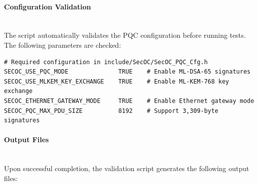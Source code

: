\paragraph{Configuration Validation}
\mbox{}\\
The script automatically validates the PQC configuration before running tests.
The following parameters are checked:

\begin{verbatim}
# Required configuration in include/SecOC/SecOC_PQC_Cfg.h
SECOC_USE_PQC_MODE              TRUE    # Enable ML-DSA-65 signatures
SECOC_USE_MLKEM_KEY_EXCHANGE    TRUE    # Enable ML-KEM-768 key exchange
SECOC_ETHERNET_GATEWAY_MODE     TRUE    # Enable Ethernet gateway mode
SECOC_PQC_MAX_PDU_SIZE          8192    # Support 3,309-byte signatures
\end{verbatim}

\paragraph{Output Files}
\mbox{}\\
Upon successful completion, the validation script generates the following output
files:

